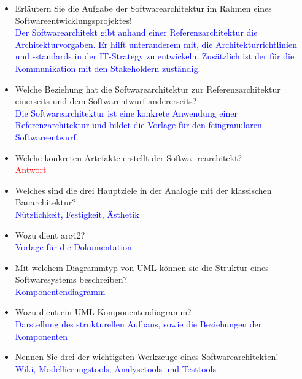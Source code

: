 \begin{itemize}
    \item Erläutern Sie die Aufgabe der Softwarearchitektur im Rahmen eines Softwareentwicklungsprojektes! \\
    \textcolor{blue}{Der Softwarearchitekt gibt anhand
    einer Referenzarchitektur die Architekturvorgaben. Er hilft unteranderem mit, die Architekturrichtlinien und -standards in der IT-Strategy zu entwickeln. Zusätzlich ist der für die Kommunikation mit den Stakeholdern zuständig.}
    \item Welche Beziehung hat die Softwarearchitektur zur Referenzarchitektur einerseits und dem Softwarentwurf andererseits? \\
    \textcolor{blue}{Die Softwarearchitektur ist eine konkrete Anwendung einer Referenzarchitektur und bildet die Vorlage für den feingranularen Softwareentwurf.}
    \item Welche konkreten Artefakte erstellt der Softwa-
    rearchitekt? \\
    \textcolor{red}{Antwort}
    \item Welches sind die drei Hauptziele in der Analogie mit der klassischen Bauarchitektur? \\
    \textcolor{blue}{Nützlichkeit, Festigkeit, Ästhetik}
    \item Wozu dient arc42? \\
    \textcolor{blue}{Vorlage für die Dokumentation}
    \item Mit welchem Diagrammtyp von UML können sie die Struktur eines Softwaresystems beschreiben? \\
    \textcolor{blue}{Komponentendiagramm}
    \item Wozu dient ein UML Komponentendiagramm? \\
    \textcolor{blue}{Darstellung des strukturellen Aufbaus, sowie die Beziehungen der Komponenten}
    \item Nennen Sie drei der wichtigsten Werkzeuge eines Softwarearchitekten! \\
    \textcolor{blue}{Wiki, Modellierungstools, Analysetools und Testtools}
\end{itemize}
